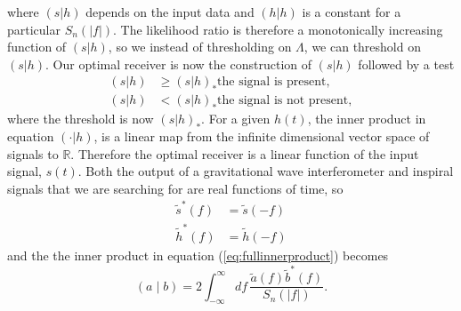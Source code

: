 where $(s|h)$ depends on the input data and $(h|h)$ is a constant for a
particular $S_n(|f|)$. The likelihood ratio is therefore a monotonically
increasing function of $(s|h)$, so we instead of thresholding on $\Lambda$, we
can threshold on $(s|h)$. Our optimal receiver is now the construction of $(s|h)$
followed by a test
\begin{equation}
\begin{split}
(s|h) &\ge (s|h)_\ast \text{the signal is present}, \\
(s|h) &< (s|h)_\ast \text{the signal is not present},
\end{split}
\end{equation}
where the threshold is now $(s|h)_\ast$. For a given $h(t)$, the inner
product in equation $(\cdot|h)$, is a linear map from the infinite dimensional
vector space of signals to $\mathbb{R}$. Therefore the optimal receiver is a
linear function of the input signal, $s(t)$. Both the output of a
gravitational wave interferometer and inspiral signals that we are searching
for are real functions of time, so 
\begin{align}
\tilde{s}^\ast(f) &= \tilde{s}(-f) \\
\tilde{h}^\ast(f) &= \tilde{h}(-f)
\end{align}
and the the inner product in equation (\ref{eq:fullinnerproduct}) becomes
\begin{equation}
\left(a\mid b\right) = 2 \int_{-\infty}^{\infty}df\,
\frac{\tilde{a}(f)\tilde{b}^\ast(f)}{S_n\left(\left|f\right|\right)}.
\label{eq:innerproduct}
\end{equation}

